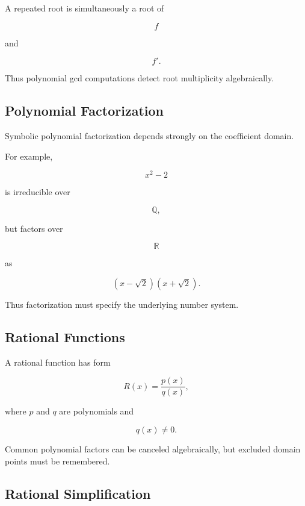 A repeated root is simultaneously a root of

\[
f
\]

and

\[
f'.
\]

Thus polynomial gcd computations detect root multiplicity algebraically.

\subsection{Polynomial Factorization}
\label{subsec:polynomial-factorization-symbolic}

Symbolic polynomial factorization depends strongly on the coefficient
domain.

For example,

\[
x^2-2
\]

is irreducible over

\[
\mathbb{Q},
\]

but factors over

\[
\mathbb{R}
\]

as

\[
\boxed{
(x-\sqrt{2})(x+\sqrt{2}).
}
\]

Thus factorization must specify the underlying number system.

\subsection{Rational Functions}
\label{subsec:symbolic-rational-functions}

A rational function has form

\[
\boxed{
R(x)
=
\frac{
p(x)
}{
q(x)
},
}
\]

where \(p\) and \(q\) are polynomials and

\[
q(x)\neq0.
\]

Common polynomial factors can be canceled algebraically, but excluded
domain points must be remembered.

\subsection{Rational Simplification}
\label{subsec:rational-simplification}

